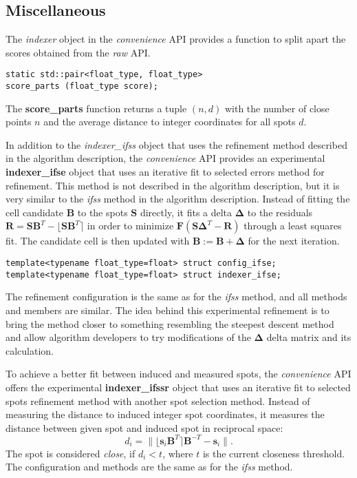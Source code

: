 \documentclass[a4paper,10pt]{article}
\newcommand{\vect}[1]{\mathbf{#1}}
\newcommand{\mat}[1]{\mathbf{#1}}
\newcommand{\round}[1]{\lfloor #1 \rceil}
\begin{document}
\subsection{Miscellaneous}

The \emph{indexer} object in the \emph{convenience} API provides a function to split apart the scores obtained from the \emph{raw} API.
%
\begin{lstlisting}
static std::pair<float_type, float_type>
score_parts (float_type score);
\end{lstlisting}
%
The \textbf{score\_parts} function returns a tuple $(n,d)$ with the number of close points $n$ and the average distance to integer coordinates for all spots $d$.

In addition to the \emph{indexer\_ifss} object that uses the refinement method described in the algorithm description, the \emph{convenience} API provides an experimental \textbf{indexer\_ifse} object that uses an iterative fit to selected errors method for refinement. This method is not described in the algorithm description, but it is very similar to the \emph{ifss} method in the algorithm description. Instead of fitting the cell candidate $\mat{B}$ to the spots $\mat{S}$ directly, it fits a delta $\mat{\Delta}$ to the residuals $\mat{R} = \mat{S}\mat{B}^T - \round{\mat{S}\mat{B}^T}$ in order to minimize $\mat{F}(\mat{S}\mat{\Delta}^T - \mat{R})$ through a least squares fit. The candidate cell is then updated with $\mat{B}:=\mat{B}+\mat{\Delta}$ for the next iteration.
%
\begin{lstlisting}
template<typename float_type=float> struct config_ifse;
template<typename float_type=float> struct indexer_ifse;
\end{lstlisting}
%
The refinement configuration is the same as for the \emph{ifss} method, and all methods and members are similar. The idea behind this experimental refinement is to bring the method closer to something resembling the steepest descent method and allow algorithm developers to try modifications of the $\mat{\Delta}$ delta matrix and its calculation.

To achieve a better fit between induced and measured spots, the \emph{convenience} API offers the experimental \textbf{indexer\_ifssr} object that uses an iterative fit to selected spots refinement method with another spot selection method. Instead of measuring the distance to induced integer spot coordinates, it measures the distance between given spot and induced spot in reciprocal space:
%
\[
d_i = \| \round{\vect{s}_i\mat{B}^T}\mat{B}^{-T} - \vect{s}_i \|.
\]
%
The spot is considered \emph{close}, if $d_i < t$, where $t$ is the current closeness threshold. The configuration and methods are the same as for the \emph{ifss} method.
\end{document}
